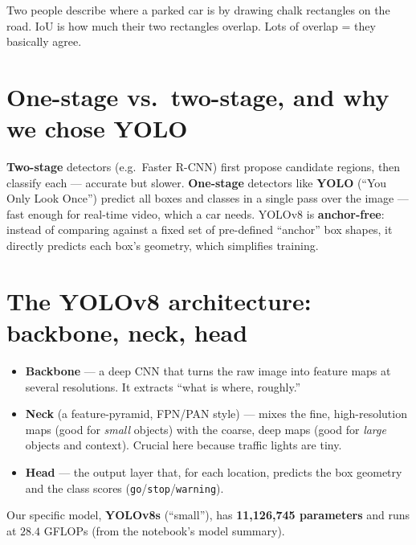 \begin{analogy}
Two people describe where a parked car is by drawing chalk rectangles on
the road. IoU is how much their two rectangles overlap. Lots of
overlap = they basically agree.
\end{analogy}

\section{One-stage vs.\ two-stage, and why we chose YOLO}
\begin{keyconcept}
\textbf{Two-stage} detectors (e.g.\ Faster R-CNN) first propose
candidate regions, then classify each --- accurate but slower.
\textbf{One-stage} detectors like \textbf{YOLO} (``You Only Look Once'')
predict all boxes and classes in a single pass over the image --- fast
enough for real-time video, which a car needs. YOLOv8 is
\textbf{anchor-free}: instead of comparing against a fixed set of
pre-defined ``anchor'' box shapes, it directly predicts each box's
geometry, which simplifies training.
\end{keyconcept}

\section{The YOLOv8 architecture: backbone, neck, head}
\label{sec:arch}
\begin{keyconcept}
\begin{itemize}
  \item \textbf{Backbone} --- a deep CNN that turns the raw image into
        feature maps at several resolutions. It extracts ``what is
        where, roughly.''
  \item \textbf{Neck} (a feature-pyramid, FPN/PAN style) --- mixes the
        fine, high-resolution maps (good for \emph{small} objects) with
        the coarse, deep maps (good for \emph{large} objects and
        context). Crucial here because traffic lights are tiny.
  \item \textbf{Head} --- the output layer that, for each location,
        predicts the box geometry and the class scores
        (\texttt{go}/\texttt{stop}/\texttt{warning}).
\end{itemize}
Our specific model, \textbf{YOLOv8s} (``small''), has
\textbf{11{,}126{,}745 parameters} and runs at $28.4$ GFLOPs
(from the notebook's model summary).
\end{keyconcept}


